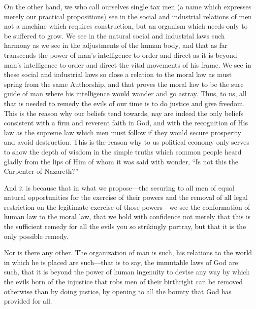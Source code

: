 \documentclass{book}
\begin{document}
On the other hand, we who call ourselves single tax men (a name which expresses merely our practical propositions) see in the social and industrial relations of men not a machine which requires construction, but an organism which needs only to be suffered to grow. We see in the natural social and industrial laws such harmony as we see in the adjustments of the human body, and that as far transcends the power of man’s intelligence to order and direct as it is beyond man’s intelligence to order and direct the vital movements of his frame. We see in these social and industrial laws so close a relation to the moral law as must spring from the same Authorship, and that proves the moral law to be the sure guide of man where his intelligence would wander and go astray. Thus, to us, all that is needed to remedy the evils of our time is to do justice and give freedom. This is the reason why our beliefs tend towards, nay are indeed the only beliefs consistent with a firm and reverent faith in God, and with the recognition of His law as the supreme law which men must follow if they would secure prosperity and avoid destruction. This is the reason why to us political economy only serves to show the depth of wisdom in the simple truths which common people heard gladly from the lips of Him of whom it was said with wonder, “Is not this the Carpenter of Nazareth?”

And it is because that in what we propose—the securing to all men of equal natural opportunities for the exercise of their powers and the removal of all legal restriction on the legitimate exercise of those powers—we see the conformation of human law to the moral law, that we hold with confidence not merely that this is the sufficient remedy for all the evils you so strikingly portray, but that it is the only possible remedy.

Nor is there any other. The organization of man is such, his relations to the world in which he is placed are such—that is to say, the immutable laws of God are such, that it is beyond the power of human ingenuity to devise any way by which the evils born of the injustice that robs men of their birthright can be removed otherwise than by doing justice, by opening to all the bounty that God has provided for all.
\end{document}
